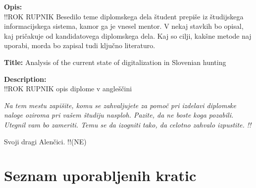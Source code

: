 \documentclass[a4paper,12pt,openright]{book}
\newcommand{\clearemptydoublepage}{\newpage{\pagestyle{empty}\cleardoublepage}}
\begin{document}
\bigskip
\noindent\textbf{Opis:}\\ !!ROK RUPNIK
Besedilo teme diplomskega dela študent prepiše iz študijskega informacijskega sistema, kamor ga je vnesel mentor. 
V nekaj stavkih bo opisal, kaj pričakuje od kandidatovega diplomskega dela. 
Kaj so cilji, kakšne metode naj uporabi, morda bo zapisal tudi ključno literaturo.

\bigskip
\noindent\textbf{Title:} 
Analysis of the current state of digitalization in Slovenian hunting

\bigskip
\noindent\textbf{Description:}\\
!!ROK RUPNIK opis diplome v angleščini

\vfill



\vspace{2cm}




\clearemptydoublepage

\thispagestyle{empty}\mbox{}\vfill\null\it%
\noindent 
Na tem mestu zapišite, komu se zahvaljujete za pomoč pri izdelavi diplomske naloge oziroma pri vašem študiju nasploh. Pazite, da ne boste koga pozabili. Utegnil vam bo zameriti. Temu se da izogniti tako, da celotno zahvalo izpustite.  !!
\rm\normalfont



\clearemptydoublepage

\thispagestyle{empty}\mbox{}{\textheight}\mbox{}\hfill\begin{minipage}{0.55\textwidth}%
Svoji dragi Alenčici. !!(NE)
\normalfont\end{minipage}

\clearemptydoublepage


\pagestyle{empty}
\def\thepage{}%
\tableofcontents{}


\clearemptydoublepage


\chapter*{Seznam uporabljenih kratic}
\end{document}
